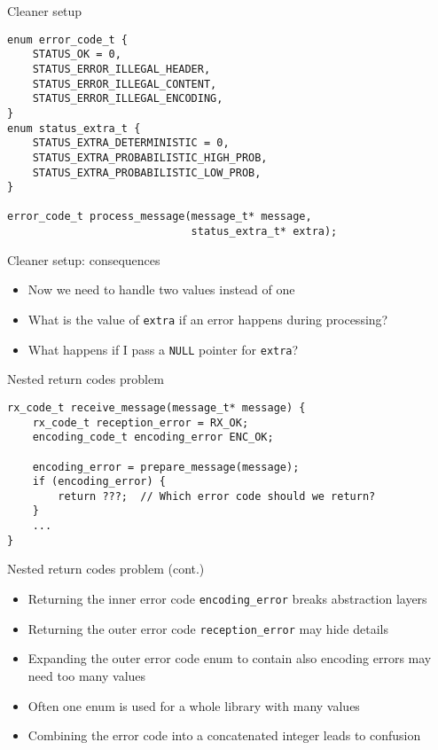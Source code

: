 \documentclass[aspectratio=169,14pt]{beamer}
\begin{document}
\begin{frame}[fragile]{Cleaner setup}
\begin{lstlisting}[style=cstyle]
enum error_code_t {
    STATUS_OK = 0,
    STATUS_ERROR_ILLEGAL_HEADER,
    STATUS_ERROR_ILLEGAL_CONTENT,
    STATUS_ERROR_ILLEGAL_ENCODING,
}
enum status_extra_t {
    STATUS_EXTRA_DETERMINISTIC = 0,
    STATUS_EXTRA_PROBABILISTIC_HIGH_PROB,
    STATUS_EXTRA_PROBABILISTIC_LOW_PROB,
}

error_code_t process_message(message_t* message,
                             status_extra_t* extra);
\end{lstlisting}
\end{frame}


\begin{frame}[fragile]{Cleaner setup: consequences}
\begin{itemize}
    \item Now we need to handle two values instead of one
    \item What is the value of \texttt{extra} if an error happens during processing?
    \item What happens if I pass a \texttt{NULL} pointer for \texttt{extra}?
\end{itemize}
\end{frame}


\begin{frame}[fragile]{Nested return codes problem}
\begin{lstlisting}[style=cstyle]
rx_code_t receive_message(message_t* message) {
    rx_code_t reception_error = RX_OK;
    encoding_code_t encoding_error ENC_OK;
    
    encoding_error = prepare_message(message);
    if (encoding_error) {
        return ???;  // Which error code should we return?
    }
    ...
}
\end{lstlisting}
\end{frame}

\begin{frame}{Nested return codes problem (cont.)}
\begin{itemize}
    \item Returning the inner error code \texttt{encoding\_error} breaks abstraction layers
    \item Returning the outer error code \texttt{reception\_error} may hide details
    \item Expanding the outer error code enum to contain also encoding errors may need too many values
    \item Often one enum is used for a whole library with many values
    \item Combining the error code into a concatenated integer leads to confusion
\end{itemize}
\end{frame}
\end{document}
